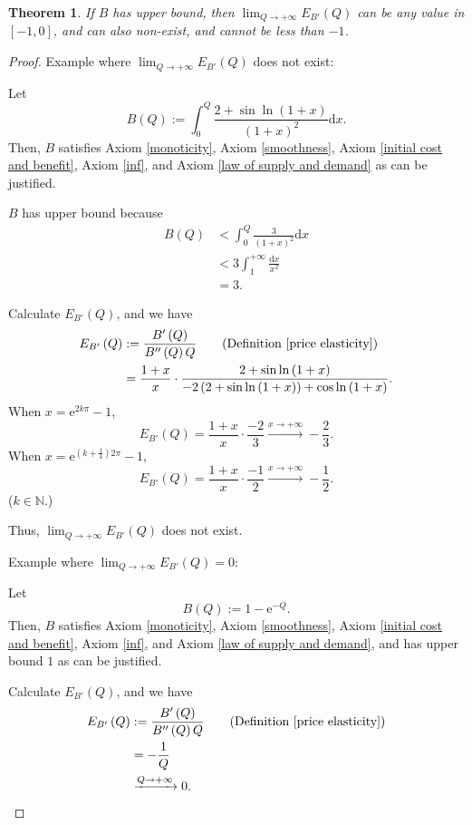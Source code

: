 \documentclass{article}
\newtheorem{theorem}{Theorem}
\begin{document}
\begin{theorem}
If $B$ has upper bound, then $\lim_{Q\to+\infty}E_{B'}\left(Q\right)$ can be any value in $\left[-1,0\right]$, and can also non-exist, and cannot be less than $-1$.
\end{theorem}
\begin{proof}
Example where $\lim_{Q\to+\infty}E_{B'}\left(Q\right)$ does not exist:

Let
$$B\left(Q\right):=\int_0^Q\frac{2+\sin\ln\left(1+x\right)}{\left(1+x\right)^2}\mathrm dx.$$
Then, $B$ satisfies Axiom \ref{monoticity}, Axiom \ref{smoothness}, Axiom \ref{initial cost and benefit}, Axiom \ref{inf}, and Axiom \ref{law of supply and demand} as can be justified.

$B$ has upper bound because
\begin{align*}
B\left(Q\right)&<\int_0^Q\frac3{\left(1+x\right)^2}\mathrm dx\\
&<3\int_1^{+\infty}\frac{\mathrm dx}{x^2}\\
&=3.
\end{align*}

Calculate $E_{B'}\left(Q\right)$, and we have
\begin{align*}
E_{B'}\left(Q\right)&:=\frac{B'\left(Q\right)}{B''\left(Q\right)Q}\qquad\text{(Definition \ref{price elasticity})}\\
&=\frac{1+x}x\cdot\frac{2+\sin\ln\left(1+x\right)}{-2\left(2+\sin\ln\left(1+x\right)\right)+\cos\ln\left(1+x\right)}.
\end{align*}
When $x=\mathrm e^{2k\pi}-1$,
$$E_{B'}\left(Q\right)=\frac{1+x}x\cdot\frac{-2}3\xrightarrow{x\to+\infty}-\frac23.$$
When $x=\mathrm e^{\left(k+\frac14\right)2\pi}-1$,
$$E_{B'}\left(Q\right)=\frac{1+x}x\cdot\frac{-1}2\xrightarrow{x\to+\infty}-\frac12.$$
($k\in\mathbb N$.)

Thus, $\lim_{Q\to+\infty}E_{B'}\left(Q\right)$ does not exist.

Example where $\lim_{Q\to+\infty}E_{B'}\left(Q\right)=0$:

Let
$$B\left(Q\right):=1-\mathrm e^{-Q}.$$
Then, $B$ satisfies Axiom \ref{monoticity}, Axiom \ref{smoothness}, Axiom \ref{initial cost and benefit}, Axiom \ref{inf}, and Axiom \ref{law of supply and demand}, and has upper bound $1$ as can be justified.

Calculate $E_{B'}\left(Q\right)$, and we have
\begin{align*}
E_{B'}\left(Q\right)&:=\frac{B'\left(Q\right)}{B''\left(Q\right)Q}\qquad\text{(Definition \ref{price elasticity})}\\
&=-\frac1Q\\
&\xrightarrow{Q\to+\infty}0.
\end{align*}


\end{proof}
\end{document}

